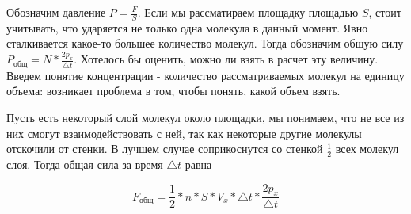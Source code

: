 Обозначим давление $P = \frac{F}{S}$. Если мы рассматираем площадку площадью $S$, стоит учитывать, что ударяется не только одна молекула в данный момент. Явно сталкивается какое-то большее количество молекул. Тогда обозначим общую силу $P_{\mbox{общ}} = N * \frac{2p_x}{\triangle t}$. Хотелось бы оценить, можно ли взять в расчет эту величину. Введем понятие концентрации - количество рассматриваемых молекул на единицу объема: возникает проблема в том, чтобы понять, какой объем взять. 

Пусть есть некоторый слой молекул около площадки, мы понимаем, что не все из них смогут взаимодействовать с ней, так как некоторые другие молекулы отскочили от стенки. В лучшем случае соприкоснутся со стенкой $\frac{1}{2}$ всех молекул слоя. Тогда общая сила за время $\triangle t$ равна

\[F_{\mbox{общ}} = \frac{1}{2} * n * S * V_x * \triangle t * \frac{2p_x}{\triangle t}\]
